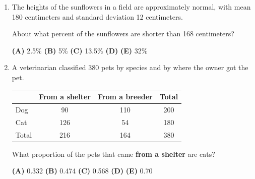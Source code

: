 \documentclass[12pt]{article}
\begin{document}
\begin{enumerate}[leftmargin=1.9em, itemsep=0.13in]
  \boxguard[8]
  \item The heights of the sunflowers in a field are approximately normal, with mean 180
        centimeters and standard deviation 12 centimeters.

        About what percent of the sunflowers are shorter than 168 centimeters?\hfill{}\rule[-0.2in]{0pt}{0.48in}
        \par\vspace{3pt}\noindent
        \hspace{1.2em}\textbf{(A)} 2.5\% \hfill \textbf{(B)} 5\% \hfill
        \textbf{(C)} 13.5\% \hfill \textbf{(D)}  \hfill \textbf{(E)} 32\%

  \boxguard[13]
  \item A veterinarian classified 380 pets by species and by where the owner got the pet.

        \vspace{2pt}
        {\centering\small
        \renewcommand{\arraystretch}{1.15}
        \begin{tabular}{@{} l c c c @{}}
        \rowcolor{sky}
         & \textbf{From a shelter} & \textbf{From a breeder} & \textbf{Total} \\
        \midrule
        Dog   & 90  & 110 & 200 \\
        Cat   & 126 & 54  & 180 \\
        \midrule
        Total & 216 & 164 & 380 \\
        \end{tabular}\par}
        \vspace{4pt}

        What proportion of the pets that came \textbf{from a shelter} are cats?\hfill{}\rule[-0.2in]{0pt}{0.48in}
        \par\vspace{3pt}\noindent
        \hspace{1.2em}\textbf{(A)} 0.332 \hfill \textbf{(B)} 0.474 \hfill
        \textbf{(C)} 0.568 \hfill \textbf{(D)}  \hfill \textbf{(E)} 0.70


\end{enumerate}
\end{document}
